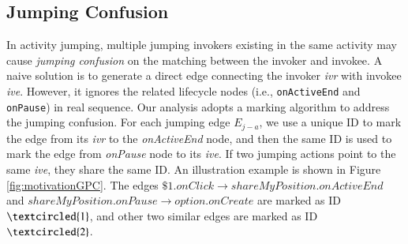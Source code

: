 \subsection{Jumping Confusion}\label{jumpConfusion}
In activity jumping, %
multiple jumping invokers %
existing in the same activity may cause \textit{jumping confusion} on the matching between the invoker and invokee. 
A naive solution is to generate a direct edge connecting the invoker \textit{ivr} with invokee \textit{ive}. However, it ignores the related lifecycle nodes (i.e., \texttt{onActiveEnd} and \texttt{onPause}) in real sequence. Our analysis adopts a marking algorithm to address the jumping confusion. For each jumping edge $E_{j-a}$, we use a unique ID to mark the edge from its \textit{ivr} to the \textit{onActiveEnd} node, and then the same ID is used to mark the edge from \textit{onPause} node to its \textit{ive}. If two jumping actions point to the same \textit{ive}, they share the same ID. An illustration example is shown in Figure \ref{fig:motivationGPC}. The edges $\$1.onClick\rightarrow shareMyPosition.onActiveEnd$ and $shareMyPosition.onPause\rightarrow option.onCreate$ are marked as ID $\textcircled{1}$, and other two similar edges are marked as ID $\textcircled{2}$.


